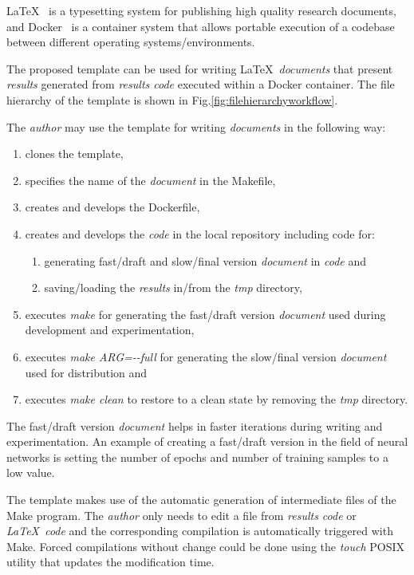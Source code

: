\documentclass[journal]{IEEEtran}
\begin{document}
\LaTeX~\cite{lamport1994latex} is a typesetting system for publishing high quality research documents, and Docker~\cite{merkel2014docker} is a container system that allows portable execution of a codebase between different operating systems/environments.

The proposed template can be used for writing \LaTeX\ \textit{documents} that present \textit{results} generated from \textit{results code} executed within a Docker container.
The file hierarchy of the template is shown in Fig.\ref{fig:filehierarchyworkflow}.

The \textit{author} may use the template for writing \textit{documents} in the following way:
\begin{enumerate}
	\item clones the template,
	\item specifies the name of the \textit{document} in the Makefile,
	\item creates and develops the Dockerfile,
	\item creates and develops the \textit{code} in the local repository including code for:
		\begin{enumerate}
			\item generating fast/draft and slow/final version \textit{document} in \textit{code} and
			\item saving/loading the \textit{results} in/from the \textit{tmp} directory,
		\end{enumerate}
	\item executes \textit{make} for generating the fast/draft version \textit{document} used during development and experimentation,
	\item executes \textit{make ARG=-{}-full} for generating the slow/final version \textit{document} used for distribution and
	\item executes \textit{make clean} to restore to a clean state by removing the \textit{tmp} directory.
\end{enumerate}

The fast/draft version \textit{document} helps in faster iterations during writing and experimentation.
An example of creating a fast/draft version in the field of neural networks is setting the number of epochs and number of training samples to a low value.

The template makes use of the automatic generation of intermediate files of the Make program.
The \textit{author} only needs to edit a file from \textit{results code} or \textit{\LaTeX\ code} and the corresponding compilation is automatically triggered with Make.
Forced compilations without change could be done using the \textit{touch} POSIX utility that updates the modification time.
\end{document}

